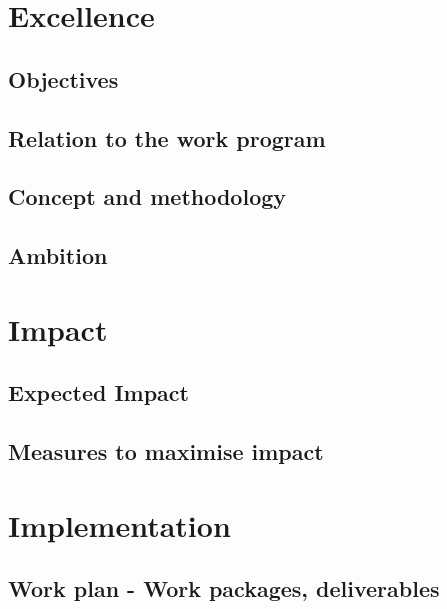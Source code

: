 \documentclass[12pt]{book}
\begin{document}
\chapter{Excellence}

\section{Objectives}



\section{Relation to the work program}



\section{Concept and methodology}



\section{Ambition}

\chapter{Impact}

\section{Expected Impact}



\section{Measures to maximise impact}

\chapter{Implementation}

\section{Work plan - Work packages, deliverables}


\end{document}
